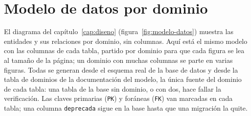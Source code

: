 \chapter[Modelo de datos por dominio]{Modelo de datos por dominio}
\label{anx:modelo-datos}

El diagrama del capítulo~\ref{cap:diseno} (figura~\ref{fig:modelo-datos}) muestra las entidades y sus relaciones por dominio, sin columnas. Aquí está el mismo modelo con las columnas de cada tabla, partido por dominio para que cada figura se lea al tamaño de la página; un dominio con muchas columnas se parte en varias figuras. Todas se generan desde el esquema real de la base de datos y desde la tabla de dominios de la documentación del modelo, la única fuente del dominio de cada tabla: una tabla de la base sin dominio, o con dos, hace fallar la verificación. Las claves primarias (\texttt{PK}) y foráneas (\texttt{FK}) van marcadas en cada tabla; una columna \texttt{deprecada} sigue en la base hasta que una migración la quite.


